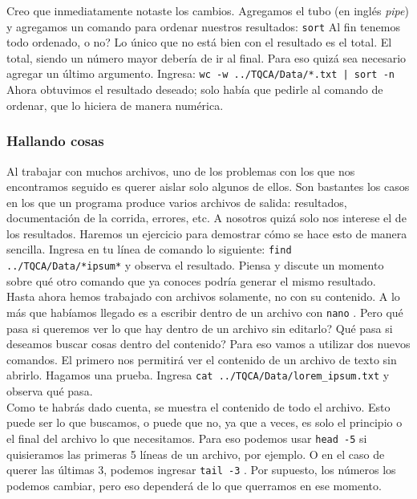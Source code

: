 \documentclass[10pt,letterpaper]{article}
\newcommand{\inlinecode}[1]{
\colorbox{light-gray}{\texttt{#1}}
}
\begin{document}
Creo que inmediatamente notaste los cambios. Agregamos el tubo (en ingl\'es \emph{pipe}) y agregamos un comando para ordenar nuestros resultados: \inlinecode{sort} Al fin tenemos todo ordenado, o no? Lo \'unico que no est\'a bien con el resultado es el total. El total, siendo un n\'umero mayor deber\'ia de ir al final. Para eso quiz\'a sea necesario agregar un \'ultimo argumento. Ingresa: \inlinecode{wc -w ../TQCA/Data/*.txt | sort -n} Ahora obtuvimos el resultado deseado; solo hab\'ia que pedirle al comando de ordenar, que lo hiciera de manera num\'erica.

\subsubsection{Hallando cosas}
Al trabajar con muchos archivos, uno de los problemas con los que nos encontramos seguido es querer aislar solo algunos de ellos. Son bastantes los casos en los que un programa produce varios archivos de salida: resultados, documentaci\'on de la corrida, errores, etc. A nosotros quiz\'a solo nos interese el de los resultados. Haremos un ejercicio para demostrar c\'omo se hace esto de manera sencilla. Ingresa en tu l\'inea de comando lo siguiente: \inlinecode{find ../TQCA/Data/*ipsum*} y observa el resultado. Piensa y discute un momento sobre qu\'e otro comando que ya conoces podr\'ia generar el mismo resultado.\\

Hasta ahora hemos trabajado con archivos solamente, no con su contenido. A lo m\'as que hab\'iamos llegado es a escribir dentro de un archivo con \inlinecode{nano}. Pero qu\'e pasa si queremos ver lo que hay dentro de un archivo sin editarlo? Qu\'e pasa si deseamos buscar cosas dentro del contenido? Para eso vamos a utilizar dos nuevos comandos. El primero nos permitir\'a ver el contenido de un archivo de texto sin abrirlo. Hagamos una prueba. Ingresa \inlinecode{cat ../TQCA/Data/lorem\_ipsum.txt} y observa qu\'e pasa.\\

Como te habr\'as dado cuenta, se muestra el contenido de todo el archivo. Esto puede ser lo que buscamos, o puede que no, ya que a veces, es solo el principio o el final del archivo lo que necesitamos. Para eso podemos usar \inlinecode{head -5} si quisieramos las primeras 5 l\'ineas de un archivo, por ejemplo. O en el caso de querer las \'ultimas 3, podemos ingresar \inlinecode{tail -3}. Por supuesto, los n\'umeros los podemos cambiar, pero eso depender\'a de lo que querramos en ese momento.\\
\end{document}
